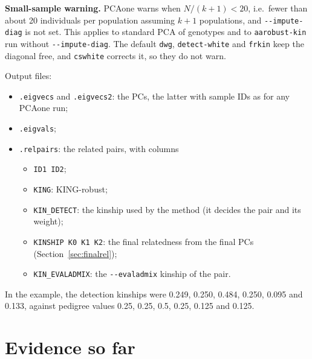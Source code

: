 \documentclass[11pt,a4paper]{article}
\newcommand{\opt}[1]{\texttt{-{}-#1}}
\begin{document}
\noindent\textbf{Small-sample warning.} PCAone warns when
$N/(k+1)<20$, i.e.\ fewer than about 20 individuals per population assuming
$k+1$ populations, and \opt{impute-diag} is not set. This applies to standard
PCA of genotypes and to \texttt{aarobust-kin} run without \opt{impute-diag}.
The default \texttt{dwg}, \texttt{detect-white} and \texttt{frkin} keep the
diagonal free, and \texttt{cswhite} corrects it, so they do not warn.

\medskip
\noindent Output files:
\begin{itemize}
  \item \texttt{.eigvecs} and \texttt{.eigvecs2}: the PCs, the latter with
    sample IDs as for any PCAone run;
  \item \texttt{.eigvals};
  \item \texttt{.relpairs}: the related pairs, with columns
    \begin{itemize}
      \item \texttt{ID1 ID2};
      \item \texttt{KING}: KING-robust;
      \item \texttt{KIN\_DETECT}: the kinship used by the method (it decides
        the pair and its weight);
      \item \texttt{KINSHIP K0 K1 K2}: the final relatedness from the final
        PCs (Section~\ref{sec:finalrel});
      \item \texttt{KIN\_EVALADMIX}: the \opt{evaladmix} kinship of the pair.
    \end{itemize}
\end{itemize}
In the example, the detection kinships were 0.249, 0.250, 0.484, 0.250, 0.095
and 0.133, against pedigree values 0.25, 0.25, 0.5, 0.25, 0.125 and 0.125.

\section{Evidence so far}
\label{sec:evidence}
\end{document}
